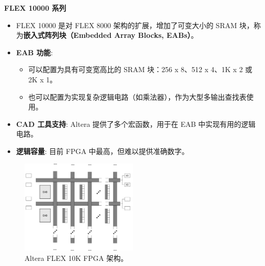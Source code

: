 \begin{frame}[allowframebreaks]{\textbf{FLEX 10000 系列}}
\begin{itemize}
\tightlist
\item
FLEX 10000 是对 FLEX 8000 架构的扩展，增加了可变大小的 SRAM
块，称为\textbf{嵌入式阵列块（Embedded Array Blocks, EABs）}。
\item
\textbf{EAB 功能}:

\begin{itemize}
\tightlist
\item
    可以配置为具有可变宽高比的 SRAM 块：256 x 8、512 x 4、1K x 2 或 2K
    x 1。
\item
    也可以配置为实现复杂逻辑电路（如乘法器），作为大型多输出查找表使用。
\end{itemize}
\item
\textbf{CAD 工具支持}: Altera 提供了多个宏函数，用于在 EAB
中实现有用的逻辑电路。
\item
\textbf{逻辑容量}: 目前 FPGA 中最高，但难以提供准确数字。
\end{itemize}
\begin{figure}
    \centering
    \includegraphics[width=0.5\textwidth]{img1/FLEX10K.jpeg}
    \caption{Altera FLEX 10K FPGA 架构。}
\end{figure}
\end{frame}

